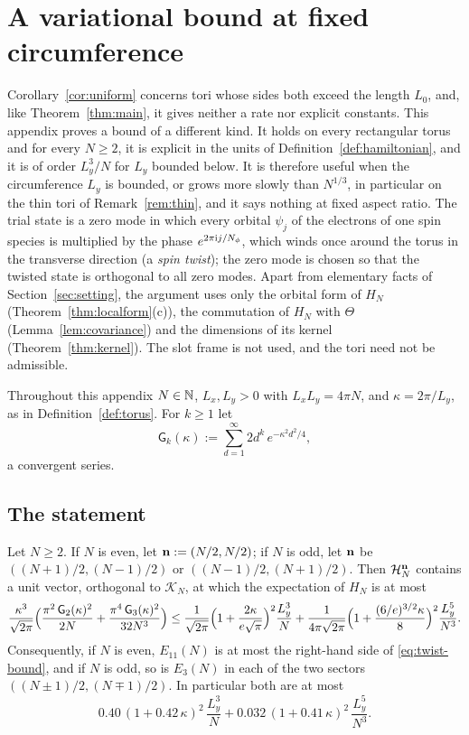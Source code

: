\section{A variational bound at fixed circumference}\label{app:twist}

Corollary~\ref{cor:uniform} concerns tori whose sides both exceed the length $L_0$, and, like Theorem~\ref{thm:main},
it gives neither a rate nor explicit constants. This appendix proves a bound of a different kind. It holds on every
rectangular torus and for every $N\ge2$, it is explicit in the units of Definition~\ref{def:hamiltonian}, and it is of
order $L_y^3/N$ for $L_y$ bounded below. It is therefore useful when the circumference $L_y$ is bounded, or grows more slowly than $N^{1/3}$, in
particular on the thin tori of Remark~\ref{rem:thin}, and it says nothing at fixed aspect ratio. The trial state is a
zero mode in which every orbital $\psi_j$ of the electrons of one spin species is multiplied by the phase
$e^{2\pi\mathrm{i} j/N_{\phi}}$, which winds once around the torus in the transverse direction (a \emph{spin twist}); the zero mode
is chosen so that the twisted state is orthogonal to all zero modes. Apart from elementary facts of
Section~\ref{sec:setting}, the argument uses only the orbital form of $H_N$ (Theorem~\ref{thm:localform}(c)), the
commutation of $H_N$ with $\Theta$ (Lemma~\ref{lem:covariance}) and the dimensions of its kernel
(Theorem~\ref{thm:kernel}). The slot frame is not used, and the tori need not be admissible.

Throughout this appendix $N\in\mathbb{N}$, $L_x,L_y>0$ with $L_xL_y=4\pi N$, and $\kappa=2\pi/L_y$, as in
Definition~\ref{def:torus}. For $k\ge1$ let
\begin{equation}\label{eq:gauss-sums}
\mathsf G_k(\kappa):=\sum_{d=1}^\infty2d^k\,e^{-\kappa^2d^2/4},
\end{equation}
a convergent series.

\subsection{The statement}

\begin{theorem}\label{thm:twist}
Let $N\ge2$. If $N$ is even, let $\mathbf{n}:=(N/2,N/2)$; if $N$ is odd, let $\mathbf{n}$ be $((N+1)/2,(N-1)/2)$ or
$((N-1)/2,(N+1)/2)$. Then $\mathcal{H}_N^{\mathbf{n}}$ contains a unit vector, orthogonal to $\mathcal K_N$, at which the expectation of
$H_N$ is at most
\begin{equation}\label{eq:twist-bound}
\frac{\kappa^3}{\sqrt{2\pi}}\Bigl(\frac{\pi^2\,\mathsf G_2(\kappa)^2}{2N}+\frac{\pi^4\,\mathsf G_3(\kappa)^2}{32N^3}\Bigr)
\le\frac1{\sqrt{2\pi}}\Bigl(1+\frac{2\kappa}{e\sqrt\pi}\Bigr)^2\frac{L_y^3}N
+\frac1{4\pi\sqrt{2\pi}}\Bigl(1+\frac{(6/e)^{3/2}\kappa}8\Bigr)^2\frac{L_y^5}{N^3}.
\end{equation}
Consequently, if $N$ is even, $E_{11}(N)$ is at most the right-hand side of \eqref{eq:twist-bound}, and if $N$ is odd,
so is $E_3(N)$ in each of the two sectors $((N\pm1)/2,(N\mp1)/2)$. In particular both are at most
\[
0.40\,(1+0.42\,\kappa)^2\,\frac{L_y^3}N+0.032\,(1+0.41\,\kappa)^2\,\frac{L_y^5}{N^3}.
\]
\end{theorem}

